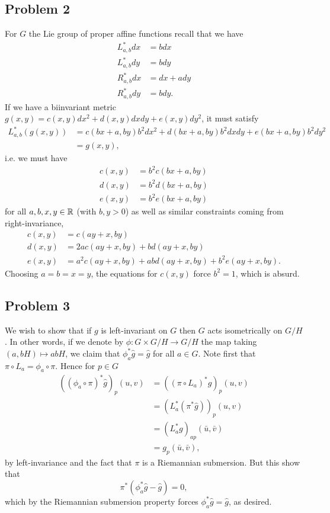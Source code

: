 \documentclass{../mathnotes}
\begin{document}
\subsection*{Problem 2}
For $G$ the Lie group of proper affine functions recall that we have
\begin{align*}
    L_{a,b}^*dx&=b dx\\
    L_{a,b}^*dy&=b dy\\
    R_{a,b}^*dx&=dx+ady\\
    R_{a,b}^*dy&=b dy.
\end{align*}
If we have a biinvariant metric $g(x,y)=c(x,y)dx^2+d(x,y)dxdy+e(x,y)dy^2$, it must satisfy
\begin{align*}
    L_{a,b}^*(g(x,y)) &= c(bx+a,by)b^2dx^2+d(bx+a,by)b^2dxdy+e(bx+a,by)b^2dy^2\\
    &= g(x,y),
\end{align*}
i.e. we must have
\begin{align*}
    c(x,y) &= b^2c(bx+a,by)\\
    d(x,y) &= b^2d(bx+a,by)\\
    e(x,y) &= b^2e(bx+a,by)
\end{align*}
for all $a,b,x,y\in\mathbb{R}$ (with $b,y>0$) as well as similar constraints coming from right-invariance,
\begin{align*}
    c(x,y) &= c(ay+x,by)\\
    d(x,y) &= 2ac(ay+x,by)+bd(ay+x,by)\\
    e(x,y) &= a^2c(ay+x,by)+abd(ay+x,by)+b^2e(ay+x,by).
\end{align*}
Choosing $a=b=x=y$, the equations for $c(x,y)$ force $b^2=1$, which is absurd.

\subsection*{Problem 3}
We wish to show that if $g$ is left-invariant on $G$ then $G$ acts isometrically on $G/H$. In other
words, if we denote by $\phi:G\times G/H\to G/H$ the map taking $(a,bH)\mapsto abH$, we claim that $\phi_a^*\hat g=\hat g$
for all $a\in G$. Note first that $\pi\circ L_a=\phi_a\circ\pi$. Hence for $p\in G$
\begin{align*}
    \left( (\phi_a\circ\pi)^*\hat g \right)_p(u,v) &= \left((\pi\circ L_a)^*\hat g\right)_p(u,v)\\
    &= \left(L_a^*(\pi^*\hat g)\right)_p(u,v)\\
    &= \left(L_a^*g\right)_{ap}(\bar u,\bar v)\\
    &= g_p(\bar u,\bar v),
\end{align*}
by left-invariance and the fact that $\pi$ is a Riemannian submersion. But this show that
\[\pi^*\left( \phi_a^*\hat g-\hat g \right)=0,\]
which by the Riemannian submersion property forces $\phi^*_a\hat g=\hat g$, as desired.
\end{document}
